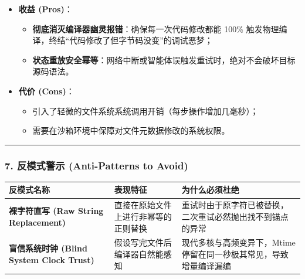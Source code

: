 \begin{itemize}
\tightlist
\item
  \textbf{收益 (Pros)}：

  \begin{itemize}
  \tightlist
  \item
    \textbf{彻底消灭编译器幽灵报错}：确保每一次代码修改都能 100\%
    触发物理编译，终结``代码修改了但字节码没变''的调试恶梦；
  \item
    \textbf{状态重放安全幂等}：网络中断或智能体误触发重试时，绝对不会破坏目标源码语法。
  \end{itemize}
\item
  \textbf{代价 (Cons)}：

  \begin{itemize}
  \tightlist
  \item
    引入了轻微的文件系统系统调用开销（每步操作增加几毫秒）；
  \item
    需要在沙箱环境中保障对文件元数据修改的系统权限。
  \end{itemize}
\end{itemize}

\begin{center}\rule{0.5\linewidth}{0.5pt}\end{center}

\subsubsection{7. 反模式警示 (Anti-Patterns to
Avoid)}\label{ux53cdux6a21ux5f0fux8b66ux793a-anti-patterns-to-avoid-8}

{\def\LTcaptype{} %
\begin{longtable}[]{@{}
  >{\raggedright\arraybackslash}p{}
  >{\raggedright\arraybackslash}p{}
  >{\raggedright\arraybackslash}p{}@{}}
\toprule\noalign{}
\begin{minipage}[b]{\linewidth}\raggedright
反模式名称
\end{minipage} & \begin{minipage}[b]{\linewidth}\raggedright
表现特征
\end{minipage} & \begin{minipage}[b]{\linewidth}\raggedright
为什么必须杜绝
\end{minipage} \\
\midrule\noalign{}
\endhead
\bottomrule\noalign{}
\endlastfoot
\textbf{裸字符直写 (Raw String Replacement)} &
直接在原始文件上进行非幂等的正则替换 &
重试时由于原字符已被替换，二次重试必然抛出找不到锚点的异常 \\
\textbf{盲信系统时钟 (Blind System Clock Trust)} &
假设写完文件后编译器自然能感知 & 现代多核与高频变异下，Mtime
停留在同一秒极其常见，导致增量编译漏编 \\
\end{longtable}
}

